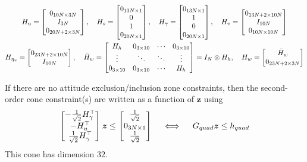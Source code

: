 \documentclass[10pt]{article}
\begin{document}
\begin{gather*}
H_u = \begin{bmatrix}
0_{10N \times 3N} \\ I_{3N} \\ 0_{20N+2 \times 3N}
\end{bmatrix}, \quad H_s = \begin{bmatrix}
0_{13N \times 1} \\ 0 \\ 1 \\ 0_{20N \times 1}
\end{bmatrix}, \quad H_{\gamma} = \begin{bmatrix}
0_{13N \times 1} \\ 1 \\ 0 \\ 0_{20N \times 1}
\end{bmatrix}, \quad H_v = \begin{bmatrix}
0_{13N+2 \times 10N} \\ I_{10N} \\ 0_{10N \times 10N} 
\end{bmatrix}  \\
H_{\eta_v} = \begin{bmatrix}
0_{23N+2 \times 10N} \\ I_{10N}
\end{bmatrix}, \quad
\bar{H}_w = \begin{bmatrix}
H_h & 0_{3 \times 10} & \cdots & 0_{3 \times 10} \\
\vdots & \ddots & \ddots & \vdots \\
0_{3 \times 10} & 0_{3 \times 10} & \cdots & H_h
\end{bmatrix} = I_{N} \otimes H_h, \quad H_w = \begin{bmatrix}
\bar{H}_w \\ 0_{23N+2 \times 3N} 
\end{bmatrix}
\end{gather*}

If there are no attitude exclusion/inclusion zone constraints, then the second-order cone constraint(s) are written as a function of $\bm{z}$ using
\begin{equation}
\begin{bmatrix}
-\frac{1}{\sqrt{2}}H_{\gamma}^{\top} \\ -H_u^{\top} \\ \frac{1}{\sqrt{2}} H_{\gamma}^{\top}
\end{bmatrix} \bm{z} \leq \begin{bmatrix} 
\frac{1}{\sqrt{2}} \\ 0_{3N \times 1} \\ \frac{1}{\sqrt{2}}
\end{bmatrix} \quad \iff \quad G_{quad} \bm{z} \leq h_{quad}
\label{eq:std_b_quad}
\end{equation}
This cone has dimension $32$. 
\end{document}
